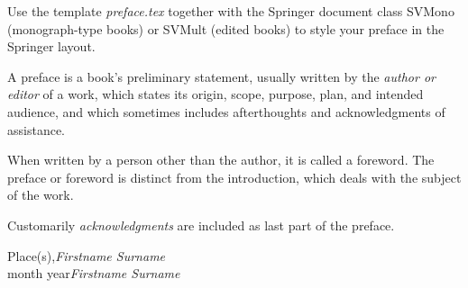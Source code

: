 %
%

\preface

Use the template \emph{preface.tex} together with the Springer document class SVMono (monograph-type books) or SVMult (edited books) to style your preface in the Springer layout.

A preface is a book's preliminary statement, usually written by the \textit{author or editor} of a work, which states its origin, scope, purpose, plan, and intended audience, and which sometimes includes afterthoughts and acknowledgments of assistance. 

When written by a person other than the author, it is called a foreword. The preface or foreword is distinct from the introduction, which deals with the subject of the work.

Customarily \textit{acknowledgments} are included as last part of the preface.
 

\vspace{\baselineskip}
\begin{flushright}\noindent
Place(s),\hfill {\it Firstname  Surname}\\
month year\hfill {\it Firstname  Surname}\\
\end{flushright}


